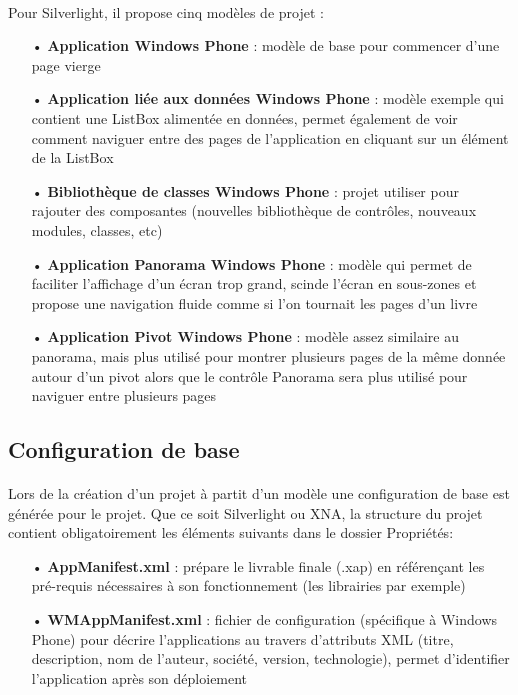 \documentclass[twoside,UTF8]{EPURapport}
\begin{document}
\paragraph{}
Pour Silverlight, il propose cinq modèles de projet : 
\begin{itemize}
	\item[•]\textbf{Application Windows Phone} : modèle de base pour commencer d'une page vierge
	\item[•]\textbf{Application liée aux données Windows Phone} : modèle exemple qui contient une ListBox alimentée en données, permet également de voir comment naviguer entre des pages de l'application en cliquant sur un élément de la ListBox
	\item[•]\textbf{Bibliothèque de classes Windows Phone} : projet utiliser pour rajouter des composantes (nouvelles bibliothèque de contrôles, nouveaux modules, classes, etc)
	\item[•]\textbf{Application Panorama Windows Phone} : modèle qui permet de faciliter l'affichage d'un écran trop grand, scinde l'écran en sous-zones et propose une navigation fluide comme si l'on tournait les pages d'un livre
	\item[•]\textbf{Application Pivot Windows Phone} : modèle assez similaire au panorama, mais plus utilisé pour montrer plusieurs pages de la même donnée autour d'un pivot alors que le contrôle Panorama sera plus utilisé pour naviguer entre plusieurs pages
\end{itemize}

		\subsection{Configuration de base}
\paragraph{}
Lors de la création d'un projet à partit d'un modèle une configuration de base est générée pour le projet. Que ce soit Silverlight ou XNA, la structure du projet contient obligatoirement les éléments suivants dans le dossier Propriétés: 
\begin{itemize}
	\item[•]\textbf{AppManifest.xml} : prépare le livrable finale (.xap) en référençant les pré-requis nécessaires à son fonctionnement (les librairies par exemple)
	\item[•]\textbf{WMAppManifest.xml} : fichier de configuration (spécifique à Windows Phone) pour décrire l'applications au travers d'attributs XML (titre, description, nom de l'auteur, société, version, technologie), permet d'identifier l'application après son déploiement
\end{itemize}
\end{document}
